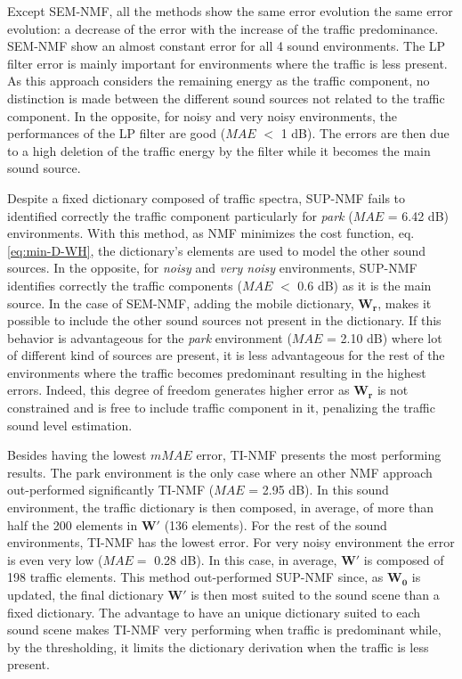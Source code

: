 \documentclass[review,5p,twocolumn,sort&compress,times]{elsarticle}
\begin{document}
Except SEM-NMF, all the methods show the same error evolution the same error evolution: a decrease of the error with the increase of the traffic predominance. SEM-NMF show an almost constant error for all 4 sound environments. The LP filter error is mainly important for environments where the traffic is less present. As this approach considers the remaining energy as the traffic component, no distinction is made between the different sound sources not related to the traffic component. In the opposite, for noisy and very noisy environments, the performances of the LP filter are good ($MAE$ $<$ 1 dB). The errors are then due to a high deletion of the traffic energy by the filter while it becomes the main sound source.

Despite a fixed dictionary composed of traffic spectra, SUP-NMF fails to identified correctly the traffic component particularly for \textit{park} ($MAE$ = 6.42 dB) environments. With this method, as NMF minimizes the cost function, eq. \ref{eq:min-D-WH}, the dictionary's elements are used to model the other sound sources. In the opposite, for \textit{noisy} and \textit{very noisy} environments, SUP-NMF identifies correctly the traffic components ($MAE$ $<$ 0.6 dB) as it is the main source.
In the case of SEM-NMF, adding the mobile dictionary, $\mathbf{W_r}$, makes it possible to include the other sound sources not present in the dictionary. If this behavior is advantageous for the \textit{park} environment ($MAE$ = 2.10 dB) where lot of different kind of sources are present, it is less advantageous for the rest of the environments where the traffic becomes predominant resulting in the highest errors. Indeed, this degree of freedom generates higher error as $\mathbf{W_r}$ is not constrained and is free to include traffic component in it, penalizing the traffic sound level estimation.

Besides having the lowest $mMAE$ error, TI-NMF presents the most performing results. The park environment is the only case where an other NMF approach out-performed significantly TI-NMF ($MAE$ = 2.95 dB). In this sound environment, the traffic dictionary is then composed, in average, of more than half the 200 elements in $\mathbf{W'}$ (136 elements). For the rest of the sound environments, TI-NMF has the lowest error. For very noisy environment the error is even very low ($MAE=$ 0.28 dB). In this case, in average, $\mathbf{W'}$ is composed of 198 traffic elements. This method out-performed SUP-NMF since, as $\mathbf{W_0}$ is updated, the final dictionary $\mathbf{W'}$ is then most suited to the sound scene than a fixed dictionary. The advantage to have an unique dictionary suited to each sound scene makes TI-NMF very performing when traffic is predominant while, by the thresholding, it limits the dictionary derivation when the traffic is less present.
\end{document}
